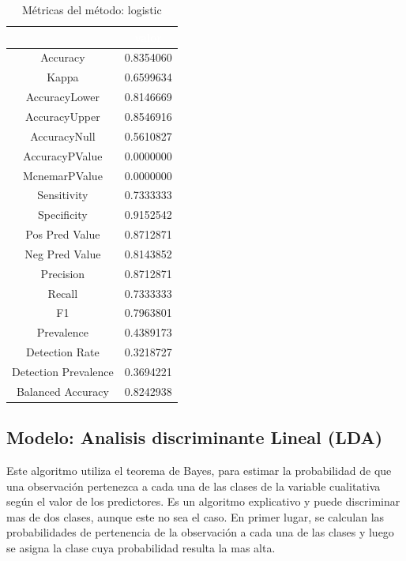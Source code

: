 \begin{table}[!h]
	
	\caption{\label{tab:metricas_logistic}Métricas del método: logistic }
	\centering
	\begin{tabular}[t]{cc}
		\toprule
		\rowcolor{black}  \multicolumn{1}{c}{\textcolor{white}{\textbf{metricas}}} & \multicolumn{1}{c}{\textcolor{white}{\textbf{valor}}}\\
		\midrule
		\rowcolor{gray!6}  Accuracy & 0.8354060\\
		Kappa & 0.6599634\\
		\rowcolor{gray!6}  AccuracyLower & 0.8146669\\
		AccuracyUpper & 0.8546916\\
		\rowcolor{gray!6}  AccuracyNull & 0.5610827\\
		\addlinespace
		AccuracyPValue & 0.0000000\\
		\rowcolor{gray!6}  McnemarPValue & 0.0000000\\
		Sensitivity & 0.7333333\\
		\rowcolor{gray!6}  Specificity & 0.9152542\\
		Pos Pred Value & 0.8712871\\
		\addlinespace
		\rowcolor{gray!6}  Neg Pred Value & 0.8143852\\
		Precision & 0.8712871\\
		\rowcolor{gray!6}  Recall & 0.7333333\\
		F1 & 0.7963801\\
		\rowcolor{gray!6}  Prevalence & 0.4389173\\
		\addlinespace
		Detection Rate & 0.3218727\\
		\rowcolor{gray!6}  Detection Prevalence & 0.3694221\\
		Balanced Accuracy & 0.8242938\\
		\bottomrule
	\end{tabular}
\end{table}




\subsection{Modelo: Analisis discriminante Lineal
	(LDA)}

Este algoritmo utiliza el teorema de Bayes, para estimar la probabilidad
de que una observación pertenezca a cada una de las clases de la
variable cualitativa según el valor de los predictores. Es un algoritmo
explicativo y puede discriminar mas de dos clases, aunque este no sea el
caso. En primer lugar, se calculan las probabilidades de
pertenencia de la observación a cada una de las clases y luego se asigna la clase cuya probabilidad resulta la mas alta.




